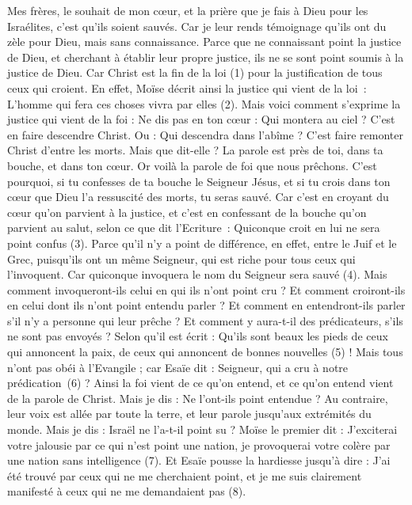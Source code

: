 \begin{multicols}{2}
\VerseOne{}Mes frères, le souhait de mon cœur, et la prière que je fais à Dieu pour les Israélites, c'est qu'ils soient sauvés.
Car je leur rends témoignage qu'ils ont du zèle pour Dieu, mais sans connaissance.
Parce que ne connaissant point la justice de Dieu, et cherchant à établir leur propre justice, ils ne se sont point soumis à la justice de Dieu.
Car Christ est la fin de la loi (1) pour la justification de tous ceux qui croient.
En effet, Moïse décrit ainsi la justice qui vient de la loi : L'homme qui fera ces choses vivra par elles (2).
Mais voici comment s'exprime la justice qui vient de la foi : Ne dis pas en ton cœur : Qui montera au ciel ? C’est en faire descendre Christ.
Ou : Qui descendra dans l'abîme ? C’est faire remonter Christ d’entre les morts.
Mais que dit-elle ? La parole est près de toi, dans ta bouche, et dans ton cœur. Or voilà la parole de foi que nous prêchons.
C'est pourquoi, si tu confesses de ta bouche le Seigneur Jésus, et si tu crois dans ton cœur que Dieu l'a ressuscité des morts, tu seras sauvé.
Car c’est en croyant du cœur qu’on parvient à la justice, et c’est en confessant de la bouche qu’on parvient au salut, selon ce que dit l’Ecriture :
Quiconque croit en lui ne sera point confus (3).
Parce qu'il n'y a point de différence, en effet, entre le Juif et le Grec, puisqu’ils ont un même Seigneur, qui est riche pour tous ceux qui l'invoquent.
Car quiconque invoquera le nom du Seigneur sera sauvé (4).
Mais comment invoqueront-ils celui en qui ils n'ont point cru ? Et comment croiront-ils en celui dont ils n'ont point entendu parler ? Et comment en entendront-ils parler s'il n'y a personne qui leur prêche ?
Et comment y aura-t-il des prédicateurs, s’ils ne sont pas envoyés ? Selon qu'il est écrit : Qu’ils sont beaux les pieds de ceux qui annoncent la paix, de ceux qui annoncent de bonnes nouvelles (5) !
Mais tous n'ont pas obéi à l'Evangile ; car Esaïe dit : Seigneur, qui a cru à notre prédication (6) ?
Ainsi la foi vient de ce qu’on entend, et ce qu’on entend vient de la parole de Christ.
Mais je dis : Ne l'ont-ils point entendue ? Au contraire, leur voix est allée par toute la terre, et leur parole jusqu’aux extrémités du monde.
Mais je dis : Israël ne l'a-t-il point su ? Moïse le premier dit : J’exciterai votre jalousie par ce qui n'est point une nation, je provoquerai votre colère par une nation sans intelligence (7).
Et Esaïe pousse la hardiesse jusqu’à dire : J'ai été trouvé par ceux qui ne me cherchaient point, et je me suis clairement manifesté à ceux qui ne me demandaient pas (8).

\end{multicols}

